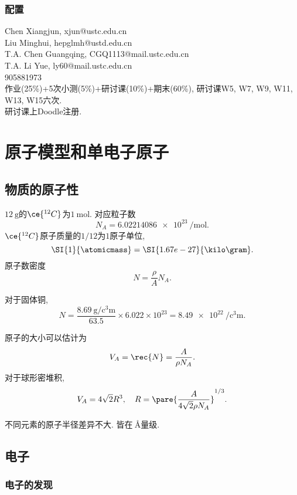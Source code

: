 \documentclass[hidelinks]{ctexart}
\begin{document}
\subsubsection*{配置} %
\label{ssub:配置}

\noindent
Chen Xiangjun, xjun@ustc.edu.cn \\
Liu Minghui, hepglmh@ustd.edu.cn \\
T.A. Chen Guangqing, CGQ1113@mail.ustc.edu.cn \\
T.A. Li Yue, ly60@mail.ustc.edu.cn \\
905881973\\
作业(25\%)+5次小测(5\%)+研讨课(10\%)+期末(60\%), 研讨课W5, W7, W9, W11, W13, W15六次.\\
研讨课上Doodle注册.


\section{原子模型和单电子原子} %
\label{sec:原子模型和单电子原子}

\subsection{物质的原子性} %
\label{sub:物质的原子性}

$\SI{12}{\gram}$的$\ce{^{12}C}$为$\SI{1}{\mole}$. 对应粒子数
\[ N_A = \SI{6.02214086e23}{\per\mol}. \]
$\ce{^{12}C}$原子质量的$1/12$为$1$原子单位,
\[ \SI{1}{\atomicmass} = \SI{1.67e-27}{\kilo\gram}. \]
原子数密度
\[ N = \frac{\rho}{A}N_A. \]
\begin{ex}
    对于固体铜,
    \[ N = \frac{\SI{8.69}{\gram\per\cubic\centi\meter}}{63.5}\times 6.022\times 10^{23} = \SI{8.49e22}{\per\cubic\centi\meter}. \]
\end{ex}
原子的大小可以估计为
\[ V_A = \rec{N} = \frac{A}{\rho N_A}. \]
对于球形密堆积,
\[ V_A = 4\sqrt{2}R^3,\quad R = \pare{\frac{A}{4\sqrt{2}\rho N_A}}^{1/3}. \]
\begin{remark}
    不同元素的原子半径差异不大. 皆在$\SI{}{\angstrom}$量级.
\end{remark}


\subsection{电子} %
\label{sub:电子}

\subsubsection{电子的发现} %
\label{ssub:电子的发现}
\end{document}
